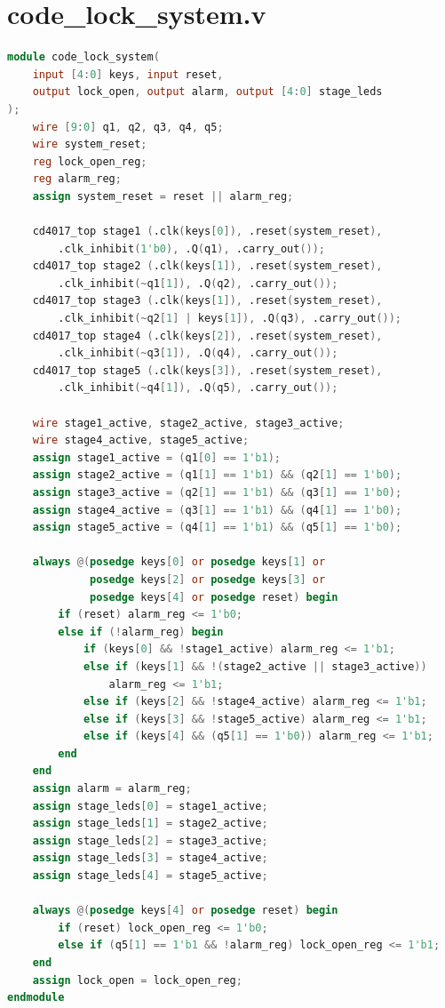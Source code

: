 \documentclass[12pt,a4paper]{report}
\begin{document}
\section{code\_lock\_system.v}
\begin{lstlisting}[language=Verilog]
module code_lock_system(
    input [4:0] keys, input reset,
    output lock_open, output alarm, output [4:0] stage_leds
);
    wire [9:0] q1, q2, q3, q4, q5;
    wire system_reset;
    reg lock_open_reg;
    reg alarm_reg;
    assign system_reset = reset || alarm_reg;

    cd4017_top stage1 (.clk(keys[0]), .reset(system_reset),
        .clk_inhibit(1'b0), .Q(q1), .carry_out());
    cd4017_top stage2 (.clk(keys[1]), .reset(system_reset),
        .clk_inhibit(~q1[1]), .Q(q2), .carry_out());
    cd4017_top stage3 (.clk(keys[1]), .reset(system_reset),
        .clk_inhibit(~q2[1] | keys[1]), .Q(q3), .carry_out());
    cd4017_top stage4 (.clk(keys[2]), .reset(system_reset),
        .clk_inhibit(~q3[1]), .Q(q4), .carry_out());
    cd4017_top stage5 (.clk(keys[3]), .reset(system_reset),
        .clk_inhibit(~q4[1]), .Q(q5), .carry_out());

    wire stage1_active, stage2_active, stage3_active;
    wire stage4_active, stage5_active;
    assign stage1_active = (q1[0] == 1'b1);
    assign stage2_active = (q1[1] == 1'b1) && (q2[1] == 1'b0);
    assign stage3_active = (q2[1] == 1'b1) && (q3[1] == 1'b0);
    assign stage4_active = (q3[1] == 1'b1) && (q4[1] == 1'b0);
    assign stage5_active = (q4[1] == 1'b1) && (q5[1] == 1'b0);

    always @(posedge keys[0] or posedge keys[1] or 
             posedge keys[2] or posedge keys[3] or 
             posedge keys[4] or posedge reset) begin
        if (reset) alarm_reg <= 1'b0;
        else if (!alarm_reg) begin
            if (keys[0] && !stage1_active) alarm_reg <= 1'b1;
            else if (keys[1] && !(stage2_active || stage3_active))
                alarm_reg <= 1'b1;
            else if (keys[2] && !stage4_active) alarm_reg <= 1'b1;
            else if (keys[3] && !stage5_active) alarm_reg <= 1'b1;
            else if (keys[4] && (q5[1] == 1'b0)) alarm_reg <= 1'b1;
        end
    end
    assign alarm = alarm_reg;
    assign stage_leds[0] = stage1_active;
    assign stage_leds[1] = stage2_active;
    assign stage_leds[2] = stage3_active;
    assign stage_leds[3] = stage4_active;
    assign stage_leds[4] = stage5_active;

    always @(posedge keys[4] or posedge reset) begin
        if (reset) lock_open_reg <= 1'b0;
        else if (q5[1] == 1'b1 && !alarm_reg) lock_open_reg <= 1'b1;
    end
    assign lock_open = lock_open_reg;
endmodule
\end{lstlisting}
\end{document}

